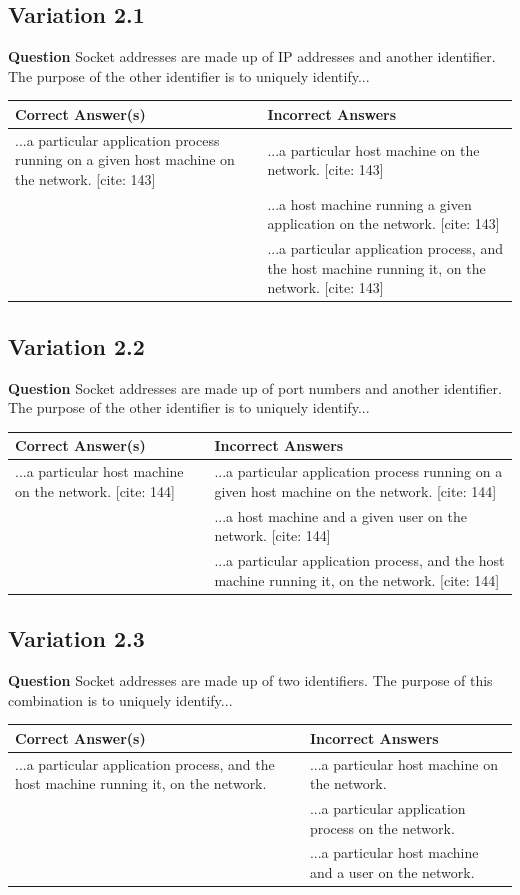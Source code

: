 \subsection{Variation 2.1}
\textbf{Question} Socket addresses are made up of IP addresses and another identifier. The purpose of the other identifier is to uniquely identify... \\
\begin{tabularx}{\textwidth}{|X|X|}
    \hline
    \textbf{Correct Answer(s)} & \textbf{Incorrect Answers} \\
    \hline
    ...a particular application process running on a given host machine on the network. [cite: 143] & ...a particular host machine on the network. [cite: 143] \\
        & ...a host machine running a given application on the network. [cite: 143] \\
        & ...a particular application process, and the host machine running it, on the network. [cite: 143] \\
    \hline
\end{tabularx}
\subsection{Variation 2.2}
\textbf{Question} Socket addresses are made up of port numbers and another identifier. The purpose of the other identifier is to uniquely identify... \\
\begin{tabularx}{\textwidth}{|X|X|}
    \hline
    \textbf{Correct Answer(s)} & \textbf{Incorrect Answers} \\
    \hline
    ...a particular host machine on the network. [cite: 144] & ...a particular application process running on a given host machine on the network. [cite: 144] \\
        & ...a host machine and a given user on the network. [cite: 144] \\
        & ...a particular application process, and the host machine running it, on the network. [cite: 144] \\
    \hline
\end{tabularx}
\subsection{Variation 2.3}
\textbf{Question} Socket addresses are made up of two identifiers. The purpose of this combination is to uniquely identify... \\
\begin{tabularx}{\textwidth}{|X|X|}
    \hline
    \textbf{Correct Answer(s)} & \textbf{Incorrect Answers} \\
    \hline
    ...a particular application process, and the host machine running it, on the network. & ...a particular host machine on the network. \\
        & ...a particular application process on the network. \\
        & ...a particular host machine and a user on the network. \\
    \hline
\end{tabularx}

